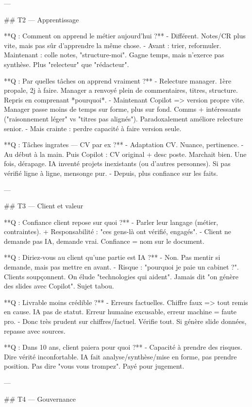 ---

## T2 — Apprentissage

**Q : Comment on apprend le métier aujourd'hui ?**
- Différent. Notes/CR plus vite, mais pas sûr d'apprendre la même chose.
- Avant : trier, reformuler. Maintenant : colle notes, "structure-moi". Gagne temps, mais n'exerce pas synthèse. Plus "relecteur" que "rédacteur".

**Q : Par quelles tâches on apprend vraiment ?**
- Relecture manager. 1ère propale, 2j à faire. Manager a renvoyé plein de commentaires, titres, structure. Repris en comprenant *pourquoi*.
- Maintenant Copilot => version propre vite. Manager passe moins de temps sur forme, plus sur fond. Comms + intéressants ("raisonnement léger" vs "titres pas alignés"). Paradoxalement améliore relecture senior.
- Mais crainte : perdre capacité à faire version seule.

**Q : Tâches ingrates — CV par ex ?**
- Adaptation CV. Nuance, pertinence.
- Au début à la main. Puis Copilot : CV original + desc poste. Marchait bien. Une fois, dérapage. IA inventé projets inexistants (ou d'autres personnes). Si pas vérifié ligne à ligne, mensonge pur.
- Depuis, plus confiance sur les faits.

---

## T3 — Client et valeur

**Q : Confiance client repose sur quoi ?**
- Parler leur langage (métier, contraintes). + Responsabilité : "ces gens-là ont vérifié, engagés".
- Client ne demande pas IA, demande vrai. Confiance = nom sur le document.

**Q : Diriez-vous au client qu'une partie est IA ?**
- Non. Pas mentir si demande, mais pas mettre en avant.
- Risque : "pourquoi je paie un cabinet ?". Clients soupçonnent. On élude "technologies qui aident". Jamais dit "on génère des slides avec Copilot". Sujet tabou.

**Q : Livrable moins crédible ?**
- Erreurs factuelles. Chiffre faux => tout remis en cause. IA pas de statut. Erreur humaine excusable, erreur machine = faute pro.
- Donc très prudent sur chiffres/factuel. Vérifie tout. Si génère slide données, repasse avec sources.

**Q : Dans 10 ans, client paiera pour quoi ?**
- Capacité à prendre des risques. Dire vérité inconfortable. IA fait analyse/synthèse/mise en forme, pas prendre position. Pas dire "vous vous trompez". Payé pour jugement.

---

## T4 — Gouvernance

